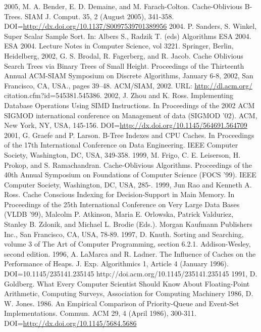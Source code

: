\documentclass[preprint,1p,times]{elsarticle}
\begin{document}
\begin{thebibliography}{9}
 2005, M. A. Bender, E. D. Demaine, and M. Farach-Colton. Cache-Oblivious B-Trees. SIAM J. Comput. 35, 2 (August 2005), 341-358. DOI=\url{http://dx.doi.org/10.1137/S0097539701389956}
 2004. P. Sanders, S. Winkel, Super Scalar Sample Sort. In: Albers S., Radzik T. (eds) Algorithms ESA 2004. ESA 2004. Lecture Notes in Computer Science, vol 3221. Springer, Berlin, Heidelberg, 
 2002, G. S. Brodal, R. Fagerberg, and R. Jacob. Cache Oblivious Search Trees via Binary Trees of Small Height. Proceedings of the Thirteenth Annual ACM-SIAM Symposium on Discrete Algorithms, January 6-8, 2002, San Francisco, CA, USA., pages 39–48. ACM/SIAM, 2002. URL: \url{http://dl.acm.org/}
citation.cfm?id=545381.545386.
 2002, J. Zhou and K. Ross. Implementing Database Operations Using SIMD Instructions. In Proceedings of the 2002 ACM SIGMOD international conference on Management of data (SIGMOD '02). ACM, New York, NY, USA, 145-156. DOI=\url{http://dx.doi.org/10.1145/564691.564709}
 2001, G. Graefe and P. Larson. B-Tree Indexes and CPU Caches. In Proceedings of the 17th International Conference on Data Engineering. IEEE Computer Society, Washington, DC, USA, 349-358.
 1999, M. Frigo, C. E. Leiserson, H. Prokop, and S. Ramachandran. Cache-Oblivious Algorithms. Proceedings of the 40th Annual Symposium on Foundations of Computer Science (FOCS '99). IEEE Computer Society, Washington, DC, USA, 285-. 
 1999, Jun Rao and Kenneth A. Ross. Cache Conscious Indexing for Decision-Support in Main Memory. In Proceedings of the 25th International Conference on Very Large Data Bases (VLDB '99), Malcolm P. Atkinson, Maria E. Orlowska, Patrick Valduriez, Stanley B. Zdonik, and Michael L. Brodie (Eds.). Morgan Kaufmann Publishers Inc., San Francisco, CA, USA, 78-89.
 1997, D. Knuth. Sorting and Searching, volume 3 of The Art of Computer Programming, section 6.2.1. Addison-Wesley, second edition.
 1996, A. LaMarca and R. Ladner. The Influence of Caches on the Performance of Heaps. J. Exp. Algorithmics 1, Article 4 (January 1996). DOI=10.1145/235141.235145 http://doi.acm.org/10.1145/235141.235145
 1991, D. Goldberg. What Every Computer Scientist Should Know About Floating-Point Arithmetic, Computing Surveys, Association for Computing Machinery
 1986, D. W. Jones. 1986. An Empirical Comparison of Priority-Queue and Event-Set Implementations. Commun. ACM 29, 4 (April 1986), 300-311. DOI=\url{http://dx.doi.org/10.1145/5684.5686}

\end{thebibliography}
\end{document}
